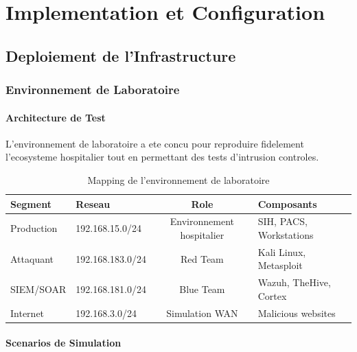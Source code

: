 \chapter{Implementation et Configuration}

\section{Deploiement de l'Infrastructure}

\subsection{Environnement de Laboratoire}

\subsubsection{Architecture de Test}

L'environnement de laboratoire a ete concu pour reproduire fidelement l'ecosysteme hospitalier tout en permettant des tests d'intrusion controles.

\begin{table}[H]
    \centering
    \caption{Mapping de l'environnement de laboratoire}
    \begin{tabular}{|l|l|c|l|}
        \hline
        \textbf{Segment} & \textbf{Reseau}  & \textbf{Role}             & \textbf{Composants}     \\
        \hline
        Production       & 192.168.15.0/24  & Environnement hospitalier & SIH, PACS, Workstations \\
        \hline
        Attaquant        & 192.168.183.0/24 & Red Team                  & Kali Linux, Metasploit  \\
        \hline
        SIEM/SOAR        & 192.168.181.0/24 & Blue Team                 & Wazuh, TheHive, Cortex  \\
        \hline
        Internet         & 192.168.3.0/24   & Simulation WAN            & Malicious websites      \\
        \hline
    \end{tabular}
\end{table}

\subsubsection{Scenarios de Simulation}

